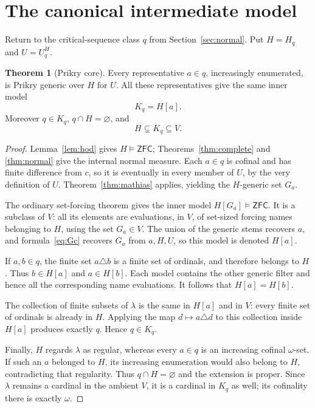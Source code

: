 \documentclass[11pt,letterpaper]{article}
\theoremstyle{definition}
\newtheorem{theorem}[definition]{Theorem}
\numberwithin{equation}{section}
\newcommand{\ZFC}{\mathsf{ZFC}}
\begin{document}
\section{The canonical intermediate model}\label{sec:core}

Return to the critical-sequence class $q$ from Section~\ref{sec:normal}. Put $H=H_q$ and $U=U_q^H$.

\begin{theorem}[Prikry core]\label{thm:core}
Every representative $a\in q$, increasingly enumerated, is Prikry generic over $H$ for $U$. All these representatives give the same inner model
\[
 K_q=H[a].
\]
Moreover $q\in K_q$, $q\cap H=\varnothing$, and
\[
 H\subsetneq K_q\subseteq V.
\]
\end{theorem}

\begin{proof}
Lemma~\ref{lem:hod} gives $H\models\ZFC$; Theorems~\ref{thm:complete} and \ref{thm:normal} give the internal normal measure. Each $a\in q$ is cofinal and has finite difference from $c$, so it is eventually in every member of $U$, by the very definition of $U$. Theorem~\ref{thm:mathias} applies, yielding the $H$-generic set $G_a$.

The ordinary set-forcing theorem gives the inner model $H[G_a]\models\ZFC$. It is a subclass of $V$: all its elements are evaluations, in $V$, of set-sized forcing names belonging to $H$, using the set $G_a\in V$. The union of the generic stems recovers $a$, and formula~\eqref{eq:Gc} recovers $G_a$ from $a,H,U$, so this model is denoted $H[a]$.

If $a,b\in q$, the finite set $a\triangle b$ is a finite set of ordinals, and therefore belongs to $H$. Thus $b\in H[a]$ and $a\in H[b]$. Each model contains the other generic filter and hence all the corresponding name evaluations. It follows that $H[a]=H[b]$.

The collection of finite subsets of $\lambda$ is the same in $H[a]$ and in $V$: every finite set of ordinals is already in $H$. Applying the map $d\mapsto a\triangle d$ to this collection inside $H[a]$ produces exactly $q$. Hence $q\in K_q$.

Finally, $H$ regards $\lambda$ as regular, whereas every $a\in q$ is an increasing cofinal $\omega$-set. If such an $a$ belonged to $H$, its increasing enumeration would also belong to $H$, contradicting that regularity. Thus $q\cap H=\varnothing$ and the extension is proper. Since $\lambda$ remains a cardinal in the ambient $V$, it is a cardinal in $K_q$ as well; its cofinality there is exactly $\omega$.
\end{proof}
\end{document}
